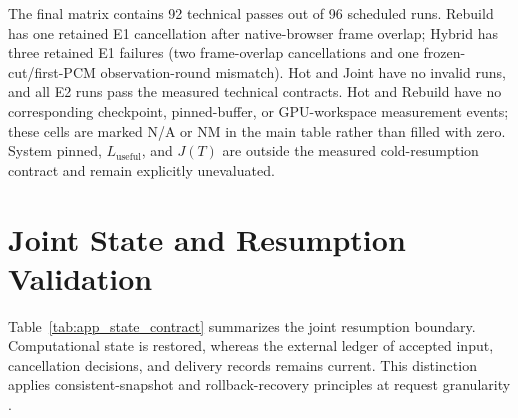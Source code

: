 The final matrix contains 92 technical passes out of 96 scheduled runs.
Rebuild has one retained E1 cancellation after native-browser frame
overlap; Hybrid has three retained E1 failures (two frame-overlap
cancellations and one frozen-cut/first-PCM observation-round mismatch).
Hot and Joint have no invalid runs, and all E2 runs pass the measured
technical contracts. Hot and Rebuild have no corresponding checkpoint,
pinned-buffer, or GPU-workspace measurement events; these cells are marked
N/A or NM in the main table rather than filled with zero. System pinned,
$L_{\mathrm{useful}}$, and $J(T)$ are outside the measured cold-resumption
contract and remain explicitly unevaluated.


\section{Joint State and Resumption Validation}
\label{app:state_contract}

Table~\ref{tab:app_state_contract} summarizes the joint resumption
boundary. Computational state is restored, whereas the external ledger
of accepted input, cancellation decisions, and delivery records remains current.
This distinction applies consistent-snapshot and rollback-recovery
principles at request granularity \citep{chandy1985,elnozahy2002}.

